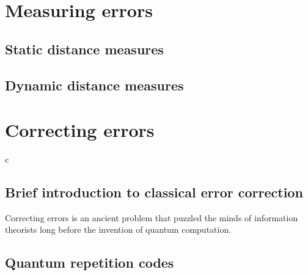 \documentclass{article}
\begin{document}
\section{Measuring errors}

\subsection{Static distance measures}

\subsection{Dynamic distance measures}

\section{Correcting errors}
c
\subsection{Brief introduction to classical error correction}

Correcting errors is an ancient problem that puzzled the minds of
information theorists long before the invention of quantum computation.

\subsection{Quantum repetition codes}
\end{document}
